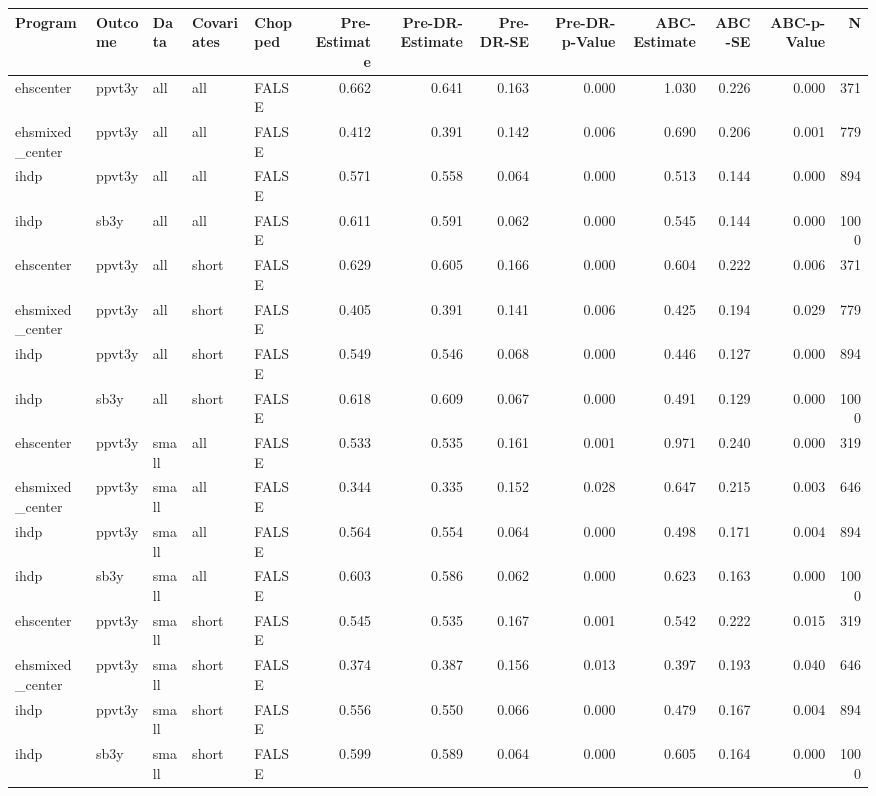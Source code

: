 \begin{table}[ht]
\centering
\begin{tabular}{lllllrrrrrrrr}
  \hline
Program & Outcome & Data & Covariates & Chopped & Pre-Estimate & Pre-DR-Estimate & Pre-DR-SE & Pre-DR-p-Value & ABC-Estimate & ABC-SE & ABC-p-Value & N \\ 
  \hline
ehscenter & ppvt3y & all & all & FALSE & 0.662 & 0.641 & 0.163 & 0.000 & 1.030 & 0.226 & 0.000 & 371 \\ 
  ehsmixed\_center & ppvt3y & all & all & FALSE & 0.412 & 0.391 & 0.142 & 0.006 & 0.690 & 0.206 & 0.001 & 779 \\ 
  ihdp & ppvt3y & all & all & FALSE & 0.571 & 0.558 & 0.064 & 0.000 & 0.513 & 0.144 & 0.000 & 894 \\ 
  ihdp & sb3y & all & all & FALSE & 0.611 & 0.591 & 0.062 & 0.000 & 0.545 & 0.144 & 0.000 & 1000 \\ 
  ehscenter & ppvt3y & all & short & FALSE & 0.629 & 0.605 & 0.166 & 0.000 & 0.604 & 0.222 & 0.006 & 371 \\ 
  ehsmixed\_center & ppvt3y & all & short & FALSE & 0.405 & 0.391 & 0.141 & 0.006 & 0.425 & 0.194 & 0.029 & 779 \\ 
  ihdp & ppvt3y & all & short & FALSE & 0.549 & 0.546 & 0.068 & 0.000 & 0.446 & 0.127 & 0.000 & 894 \\ 
  ihdp & sb3y & all & short & FALSE & 0.618 & 0.609 & 0.067 & 0.000 & 0.491 & 0.129 & 0.000 & 1000 \\ 
  ehscenter & ppvt3y & small & all & FALSE & 0.533 & 0.535 & 0.161 & 0.001 & 0.971 & 0.240 & 0.000 & 319 \\ 
  ehsmixed\_center & ppvt3y & small & all & FALSE & 0.344 & 0.335 & 0.152 & 0.028 & 0.647 & 0.215 & 0.003 & 646 \\ 
  ihdp & ppvt3y & small & all & FALSE & 0.564 & 0.554 & 0.064 & 0.000 & 0.498 & 0.171 & 0.004 & 894 \\ 
  ihdp & sb3y & small & all & FALSE & 0.603 & 0.586 & 0.062 & 0.000 & 0.623 & 0.163 & 0.000 & 1000 \\ 
  ehscenter & ppvt3y & small & short & FALSE & 0.545 & 0.535 & 0.167 & 0.001 & 0.542 & 0.222 & 0.015 & 319 \\ 
  ehsmixed\_center & ppvt3y & small & short & FALSE & 0.374 & 0.387 & 0.156 & 0.013 & 0.397 & 0.193 & 0.040 & 646 \\ 
  ihdp & ppvt3y & small & short & FALSE & 0.556 & 0.550 & 0.066 & 0.000 & 0.479 & 0.167 & 0.004 & 894 \\ 
  ihdp & sb3y & small & short & FALSE & 0.599 & 0.589 & 0.064 & 0.000 & 0.605 & 0.164 & 0.000 & 1000 \\ 

\end{tabular}
\end{table}
